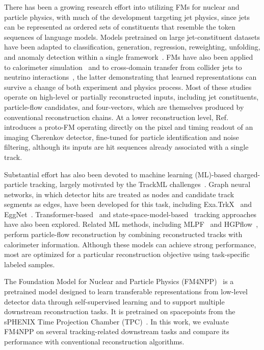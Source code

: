 \documentclass[aps,physrev,twocolumn,superscriptaddress]{revtex4-2}
\begin{document}
There has been a growing research effort into utilizing FMs for nuclear and particle physics, with much of the development targeting jet physics, since jets can be represented as ordered sets of constituents that resemble the token sequences of language models. Models pretrained on large jet-constituent datasets have been adapted to classification, generation, regression, reweighting, unfolding, and anomaly detection within a single framework~\cite{Birk:2024OmniJet,Golling:2024MPM,Harris:2025RS3L,Mikuni:2025OmniLearn,Bhimji:2026OmniLearned}. FMs have also been applied to calorimeter simulation~\cite{CardonaGiraldo:2026Calorimetry} and to cross-domain transfer from collider jets to neutrino interactions~\cite{Krzmanc:2026CrossDomain}, the latter demonstrating that learned representations can survive a change of both experiment and physics process. Most of these studies operate on high-level or partially reconstructed inputs, including jet constituents, particle-flow candidates, and four-vectors, which are themselves produced by conventional reconstruction chains. At a lower reconstruction level, Ref.~\cite{Giroux:2026ReadoutFM} introduces a proto-FM operating directly on the pixel and timing readout of an imaging Cherenkov detector, fine-tuned for particle identification and noise filtering, although its inputs are hit sequences already associated with a single track.

Substantial effort has also been devoted to machine learning (ML)-based charged-particle tracking, largely motivated by the TrackML challenges~\cite{Amrouche:2023TrackMLThroughput}. Graph neural networks, in which detector hits are treated as nodes and candidate track segments as edges, have been developed for this task, including Exa.TrkX~\cite{Ju:2021} and EggNet~\cite{Calafiura:2024}. Transformer-based~\cite{Miao:2024} and state-space-model-based~\cite{Jiang:2025} tracking approaches have also been explored. Related ML methods, including MLPF~\cite{Pata:2021MLPF} and HGPflow~\cite{Kakati:2025HGPflow}, perform particle-flow reconstruction by combining reconstructed tracks with calorimeter information. Although these models can achieve strong performance, most are optimized for a particular reconstruction objective using task-specific labeled samples.

The Foundation Model for Nuclear and Particle Physics (FM4NPP)~\cite{Park:2025FM4NPP} is a pretrained model designed to learn transferable representations from low-level detector data through self-supervised learning and to support multiple downstream reconstruction tasks. It is pretrained on spacepoints from the sPHENIX Time Projection Chamber (TPC)~\cite{Li:2026TPCpp10M}. In this work, we evaluate FM4NPP on several tracking-related downstream tasks and compare its performance with conventional reconstruction algorithms.
\end{document}
